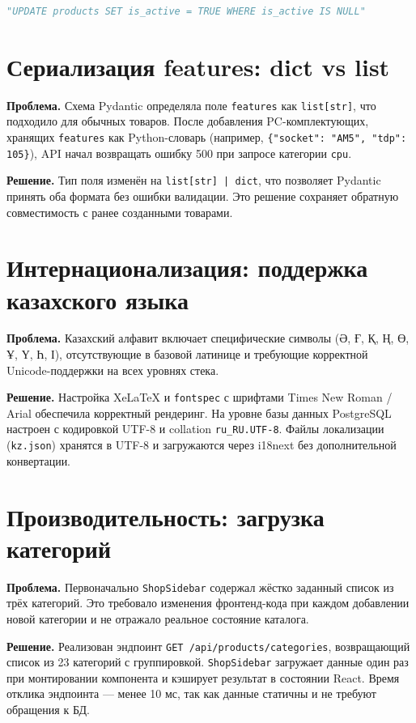 \documentclass[14pt,a4paper]{extreport}
\begin{document}
\begin{lstlisting}[language=Python]
"UPDATE products SET is_active = TRUE WHERE is_active IS NULL"
\end{lstlisting}

\section{Сериализация features: dict vs list}

\textbf{Проблема.} Схема Pydantic определяла поле \texttt{features} как \texttt{list[str]}, что подходило для обычных товаров. После добавления PC-комплектующих, хранящих \texttt{features} как Python-словарь (например, \texttt{\{"socket": "AM5", "tdp": 105\}}), API начал возвращать ошибку 500 при запросе категории \texttt{cpu}.

\textbf{Решение.} Тип поля изменён на \texttt{list[str] | dict}, что позволяет Pydantic принять оба формата без ошибки валидации. Это решение сохраняет обратную совместимость с ранее созданными товарами.

\section{Интернационализация: поддержка казахского языка}

\textbf{Проблема.} Казахский алфавит включает специфические символы (Ә, Ғ, Қ, Ң, Ө, Ұ, Ү, Һ, І), отсутствующие в базовой латинице и требующие корректной Unicode-поддержки на всех уровнях стека.

\textbf{Решение.} Настройка XeLaTeX и \texttt{fontspec} с шрифтами Times New Roman / Arial обеспечила корректный рендеринг. На уровне базы данных PostgreSQL настроен с кодировкой UTF-8 и collation \texttt{ru\_RU.UTF-8}. Файлы локализации (\texttt{kz.json}) хранятся в UTF-8 и загружаются через i18next без дополнительной конвертации.

\section{Производительность: загрузка категорий}

\textbf{Проблема.} Первоначально \texttt{ShopSidebar} содержал жёстко заданный список из трёх категорий. Это требовало изменения фронтенд-кода при каждом добавлении новой категории и не отражало реальное состояние каталога.

\textbf{Решение.} Реализован эндпоинт \texttt{GET /api/products/categories}, возвращающий список из 23 категорий с группировкой. \texttt{ShopSidebar} загружает данные один раз при монтировании компонента и кэширует результат в состоянии React. Время отклика эндпоинта — менее 10 мс, так как данные статичны и не требуют обращения к БД.
\end{document}
